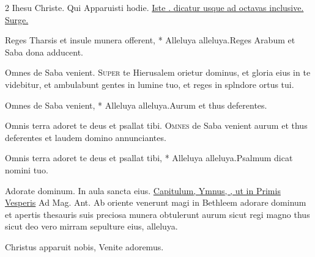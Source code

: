 \begin{multicols*}{2}
 \R Ihesu Christe. \V Qui Apparuisti hodie. \ul{Iste \Vbar . dicatur usque ad octavas inclusive.}
 \hyperlink{surge-capitulum}{Surge.}
\begin{responsory-breve}
{Reges Tharsis et insule munera offerent, * Alleluya alleluya.}{Reges Arabum et Saba dona adducent.}
\end{responsory-breve}%
\V Omnes de Saba venient.
\lettrine[lines=2]{\zallmancaps \color{Red} S}{uper} te Hierusalem orietur dominus, et gloria eius in te videbitur, et ambulabunt gentes in lumine tuo, et reges in splndore ortus tui.
\begin{responsory-breve}
{Omnes de Saba venient, * Alleluya alleluya.}{Aurum et thus deferentes.}
\end{responsory-breve}%
\V Omnis terra adoret te deus et psallat tibi.
\lettrine[lines=2]{\zallmancaps \color{Blue} O}{mnes} de Saba venient aurum et thus deferentes et laudem domino annunciantes.
\begin{responsory-breve}
{Omnis terra adoret te deus et psallat tibi, * Alleluya alleluya.}{Psalmum dicat nomini tuo.}
\end{responsory-breve}%
\V Adorate dominum. \R In aula sancta eius.
 \ul{Capitulum, Ymnus, \Vbar , ut in Primis Vesperis} {\color{Red} Ad Mag. Ant.} Ab oriente venerunt magi in Bethleem adorare dominum et apertis thesauris suis preciosa munera obtulerunt aurum sicut regi magno thus sicut deo vero mirram sepulture eius, alleluya.
{\color{Red} }
\par {}
\begin{invitatory}
{Christus apparuit nobis, Venite adoremus.}
\end{invitatory}

\end{multicols*}
